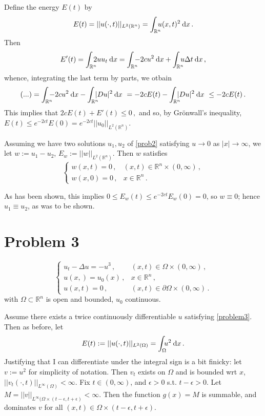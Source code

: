 \documentclass[11pt]{amsart}
\theoremstyle{definition}
\newcommand{\R}{\mathbb{R}}
\numberwithin{equation}{section}
\begin{document}
Define the energy $E(t)$ by
\begin{equation}
E(t) = ||u(\cdot, t)||_{L^2(\R^n)} = \int_{\R^n}\!\!\!\!
u(x,t)^2\:\dx\,.
\end{equation}
Then 
\begin{equation}
E'(t) =
\int_{\R^n}\!\!\!\!
2u u_t \:\dx
=
\int_{\R^n}\!\!\!\!
-2cu^2\:\dx  +
\int_{\R^n}\!\!\!\!  u\Delta t
\:\dx\,,
\end{equation}
whence, integrating the last term by parts, we otbain
\begin{equation}
(...) = 
\int_{\R^n}\!\!\!\!
-2cu^2\:\dx
- \int_{\R^n}\!\!\!\!
|Du|^2\:\dx\
= -2cE(t) - \int_{\R^n}\!\!\!\!
|Du|^2\:\dx\ \leq -2cE(t)\,.
\end{equation}
This implies that 
$
2cE(t) + E'(t) \leq 0\,,
$
and so, by Grönwall's inequality, $E(t) \leq e^{-2ct}E(0) = e^{-2ct}||u_0||_{L^2(\R^n)}$.

Assuming we have two solutions $u_1, u_2$ of \eqref{prob2} satisfying $u \to 0$ as $|x| \to \infty$, we let $w := u_1 - u_2$, $E_w := ||w||_{L^2(\R^n)}$.
Then $w$ satisfies
\begin{equation}
\left\{
\begin{array}{cc}
w(x,t) = 0\,, &(x,t)\in\R^n\times(0,\infty)\,, \\
w(x,0) = 0\,, &x\in\R^n\,.
\end{array}
\right.
\end{equation}

As has been shown, this implies $0 \leq E_w(t) \leq e^{-2ct}E_w(0) = 0$, so $w \equiv 0$; hence $u_1 \equiv u_2$, as was to be shown.

\section{Problem 3}
\begin{equation}\tag{***}\label{problem3}
\left\{
\begin{array}{cc}
u_t - \Delta u = -u^3\,, &(x,t) \in \Omega \times (0,\infty)\,,\\
u(x,) = u_0(x)\,, & x\in\R^n\,, \\
u(x,t) = 0\,, & (x,t) \in \partial \Omega \times (0,\infty)\,.
\end{array}
\right.
\end{equation}
with $\Omega \subset \R^n$ is open and bounded, $u_0$ continuous.

Assume there exists a twice continuously differentiable $u$ satisfying \eqref{problem3}.
Then as before, let
\begin{equation}
E(t) := 
||u(\cdot, t)||_{L^2(\Omega)}
=
\int_\Omega\!\!\!
u^2
\:\mbox{d}x\,.
\end{equation}
Justifying that I can differentiate under the integral sign is a bit finicky: let $v := u^2$ for simplicity of notation. Then $v_t$ exists on $\Omega$ and is bounded wrt $x$, $||v_t(\cdot, t)||_{L^\infty(\Omega)} < \infty$. Fix $t \in (0,\infty)$, and $\epsilon > 0$ s.t. $t-\epsilon > 0$. Let $M = ||v||_{L^{\infty}(\Omega \times (t-\epsilon, t+\epsilon)} < \infty$. Then the function $g(x) = M$ is summable, and dominates $v$ for all $(x,t) \in\Omega\times(t-\epsilon, t+\epsilon)$.
\end{document}
